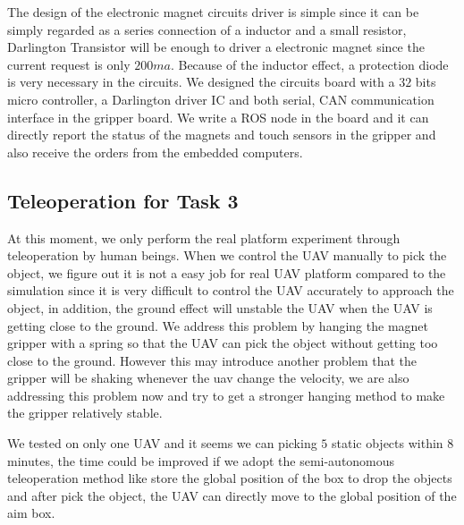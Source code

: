 \documentclass{standalone}
\begin{document}
The design of the electronic magnet circuits driver is simple since it can be simply regarded as a series connection of a inductor and a small resistor, Darlington Transistor will be enough to driver a electronic magnet since the current request is only $200ma$. Because of the inductor effect, a protection diode is very necessary in the circuits. We designed the circuits board with a $32$ bits micro controller, a Darlington driver IC and both serial, CAN communication interface in the gripper board. We write a ROS node in the board and it can directly report the status of the magnets and touch sensors in the gripper and also receive the orders from the embedded computers. 

\subsection{Teleoperation for Task 3}
At this moment, we only perform the real platform experiment through teleoperation by human beings. When we control the UAV manually to pick the object, we figure out it is not a easy job for real UAV platform compared to the simulation since it is very difficult to control the UAV accurately to approach the object, in addition, the ground effect will unstable the UAV when the UAV is getting close to the ground. We address this problem by hanging the magnet gripper with a spring so that the UAV can pick the object without getting too close to the ground. However this may introduce another problem that the gripper will be shaking whenever the uav change the velocity, we are also addressing this problem now and try to get a stronger hanging method to make the gripper relatively stable.

We tested on only one UAV and it seems we can picking $5$ static objects within $8$ minutes, the time could be improved if we adopt the semi-autonomous teleoperation method like store the global position of the box to drop the objects and after pick the object, the UAV can directly move to the global position of the aim box.
\end{document}
